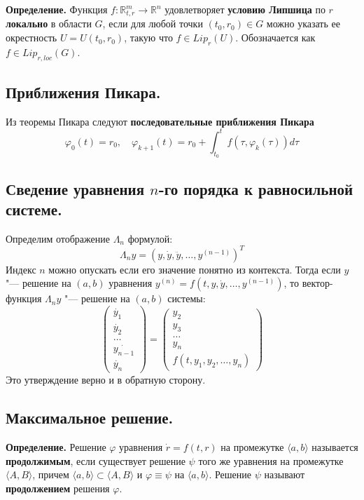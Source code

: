 \documentclass{article}
\begin{document}
\noindent \textbf{Определение.} Функция $f:\mathbb{R}_{t,r}^{m} \to \mathbb{R}^n$ удовлетворяет \textbf{условию Липшица} по $r$ \textbf{локально} в области $G$, если для любой точки $(t_0, r_0) \in G$ можно указать ее окрестность $U = U(t_0, r_0)$, такую что $f \in Lip_r(U)$. Обозначается как $f \in Lip_{r,loc}(G)$.

\subsection{Приближения Пикара.}
Из теоремы Пикара следуют \textbf{последовательные приближения Пикара}
\begin{equation*}
    \varphi_0(t) = r_0, \quad \varphi_{k+1}(t) = r_0 + \int_{t_0}^t f(\tau, \varphi_k(\tau))d\tau
\end{equation*}

\subsection{Сведение уравнения $n$-го порядка к равносильной системе.}
Определим отображение $\varLambda_n$ формулой:
\begin{equation*}
    \varLambda_ny = (y, \dot{y}, \ddot{y}, \ldots, y^{(n-1)})^T
\end{equation*}
Индекс $n$ можно опускать если его значение понятно из контекста. Тогда если $y$ "--- решение на $(a, b)$ уравнения $y^{(n)} = f(t, y, \dot{y}, \ldots, y^{(n - 1)})$, то вектор-функция $\varLambda_ny$ "--- решение на $(a, b)$ системы:
\begin{equation*}
    \begin{pmatrix}
    \dot{y_1}\\
    \dot{y_2}\\
    \ldots\\
    \dot{y_{n-1}}\\
    \dot{y_n}
    \end{pmatrix}
    =
    \begin{pmatrix}
    y_2\\
    y_3\\
    \ldots\\
    y_n\\
    f(t, y_1, y_2, \ldots, y_n)
    \end{pmatrix}
\end{equation*}
Это утверждение верно и в обратную сторону.

\subsection{Максимальное решение.}
\textbf{Определение.} Решение $\varphi$ уравнения $\dot{r} = f(t,r)$ на промежутке $\langle a,b \rangle$ называется \textbf{продолжимым}, если существует решение $\psi$ того же уравнения на промежутке $\langle A, B \rangle$, причем $\langle a,b \rangle \subset \langle A,B \rangle$ и $\varphi \equiv \psi$ на $\langle a,b \rangle$. Решение $\psi$ называют \textbf{продолжением} решения $\varphi$.\\
\end{document}
